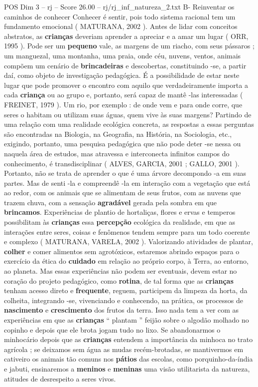 \begin{textsample}{POS Dim 3 – rj – Score 26.00 – rj/rj\_inf\_natureza\_2.txt}
B- Reinventar os caminhos de conhecer Conhecer é sentir, pois todo sistema racional tem um fundamento emocional ( MATURANA, 2002 ).
Antes de lidar com conceitos abstratos, as \textbf{crianças} deveriam aprender a apreciar e a amar um lugar ( ORR, 1995 ).
Pode ser um \textbf{pequeno} vale, as margens de um riacho, com seus pássaros ; um manguezal, uma montanha, uma praia, onde céu, nuvens, ventos, animais compõem um cenário de \textbf{brincadeiras} e descobertas, constituindo -se, a partir daí, como objeto de investigação pedagógica.
É a possibilidade de estar neste lugar que pode promover o encontro com aquilo que verdadeiramente importa a cada \textbf{criança} ou ao grupo e, portanto, será capaz de mantê -las interessadas ( FREINET, 1979 ).
Um rio, por exemplo : de onde vem e para onde corre, que seres o habitam ou utilizam suas águas, quem vive às suas margens?
Partindo de uma relação com uma realidade ecológica concreta, as respostas a essas perguntas são encontradas na Biologia, na Geografia, na História, na Sociologia, etc., exigindo, portanto, uma pesquisa pedagógica que não pode deter -se nessa ou naquela área de estudos, mas atravessa e interconecta infinitos campos do conhecimento, é transdisciplinar ( ALVES, GARCIA, 2001 ; GALLO, 2001 ).
Portanto, não se trata de aprender o que é uma árvore decompondo -a em suas partes.
Mas de senti -la e compreendê -la em interação com a vegetação que está ao redor, com os animais que se alimentam de seus frutos, com as nuvens que trazem chuva, com a sensação \textbf{agradável} gerada pela sombra em que \textbf{brincamos}.
Experiências de plantio de hortaliças, flores e ervas e temperos possibilitam às \textbf{crianças} essa \textbf{percepção} ecológica da realidade, em que as interações entre seres, coisas e fenômenos tendem sempre para um todo coerente e complexo ( MATURANA, VARELA, 2002 ).
Valorizando atividades de plantar, \textbf{colher} e comer alimentos sem agrotóxicos, estaremos abrindo espaços para o exercício da ética do \textbf{cuidado} em relação ao próprio corpo, à Terra, ao entorno, ao planeta.
Mas essas experiências não podem ser eventuais, devem estar no coração do projeto pedagógico, como \textbf{rotina}, de tal forma que as \textbf{crianças} tenham acesso direto e \textbf{frequente}, reguem, participem da limpeza da horta, da colheita, integrando -se, vivenciando e conhecendo, na prática, os processos de \textbf{nascimento} e \textbf{crescimento} dos frutos da terra.
Isso nada tem a ver com as experiências em que as \textbf{crianças} “ plantam ” feijão sobre o algodão molhado no copinho e depois que ele brota jogam tudo no lixo.
Se abandonarmos o minhocário depois que as \textbf{crianças} entendem a importância da minhoca no trato agrícola ; se deixamos sem água as mudas recém-brotadas, se mantivermos em cativeiro os animais tão comuns nos \textbf{pátios} das escolas, como porquinho-da-índia e jabuti, ensinaremos a \textbf{meninos} e \textbf{meninas} uma visão utilitarista da natureza, atitudes de desrespeito a seres vivos.

\end{textsample}
